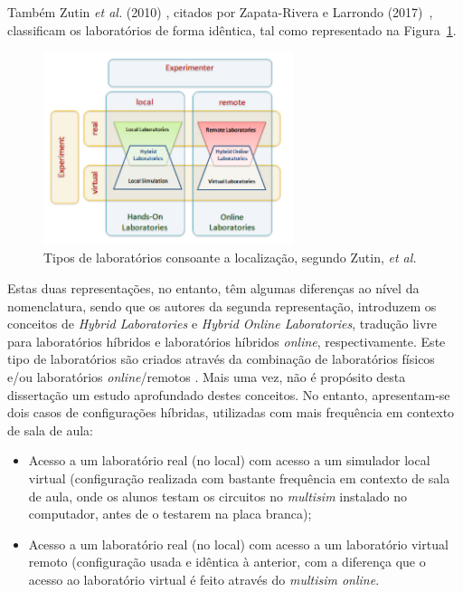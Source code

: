 Também Zutin \textit{et al.} (2010) \cite{zutinlab2go}, citados por Zapata-Rivera e Larrondo (2017)~\cite{Zapata-Rivera}, classificam os laboratórios de forma idêntica, tal como representado na Figura~\ref{fig:classificaçãozutin}.

\begin{figure}[hbtp]
    \centering
    \includegraphics[width=0.65\textwidth]{figures/carac_lab.png}
    \caption{Tipos de laboratórios consoante a localização, segundo Zutin, \textit{et al.} \cite{zutinlab2go}}
    \label{fig:classificaçãozutin}
\end{figure}

Estas duas representações, no entanto, têm algumas diferenças ao nível da nomenclatura, sendo que os autores da segunda representação, introduzem os conceitos de \textit{Hybrid Laboratories} e \textit{Hybrid Online Laboratories}, tradução livre para laboratórios híbridos e laboratórios híbridos \textit{online}, respectivamente. Este tipo de laboratórios são criados através da combinação de laboratórios físicos e/ou laboratórios \textit{online}/remotos \cite{Zapata-Rivera}. Mais uma vez, não é propósito desta dissertação um estudo aprofundado destes conceitos. No entanto, apresentam-se dois casos de configurações híbridas, utilizadas com mais frequência em contexto de sala de aula:

\begin{itemize}
    \item Acesso a um laboratório real (no local) com acesso a um simulador local virtual (configuração realizada com bastante frequência em contexto de sala de aula, onde os alunos testam os circuitos no \textit{multisim} instalado no computador, antes de o testarem na placa branca);
    \item Acesso a um laboratório real (no local) com acesso a um laboratório virtual remoto (configuração usada e idêntica à anterior, com a diferença que o acesso ao laboratório virtual é feito através do \textit{multisim online}.
\end{itemize}

